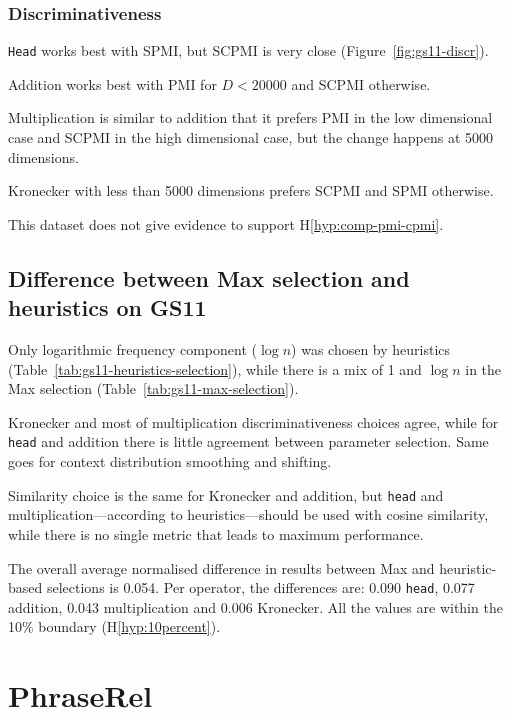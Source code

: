 \subsubsection{Discriminativeness}



\texttt{Head} works best with SPMI, but SCPMI is very close (Figure~\ref{fig:gs11-discr}).

Addition works best with PMI for $D < 20000$ and SCPMI otherwise.

Multiplication is similar to addition that it prefers PMI in the low dimensional case and SCPMI in the high dimensional case, but the change happens at 5000 dimensions.

Kronecker with less than 5000 dimensions prefers SCPMI and SPMI otherwise.

This dataset does not give evidence to support H\ref{hyp:comp-pmi-cpmi}.

\subsection{Difference between Max selection and heuristics on GS11}

Only logarithmic frequency component ($\log n$) was chosen by heuristics (Table~\ref{tab:gs11-heuristics-selection}), while there is a mix of 1 and $\log n$ in the Max selection (Table~\ref{tab:gs11-max-selection}).

Kronecker and most of multiplication discriminativeness choices agree, while for \texttt{head} and addition there is little agreement between parameter selection. Same goes for context distribution smoothing and shifting.

Similarity choice is the same for Kronecker and addition, but \texttt{head} and multiplication---according to heuristics---should be used with cosine similarity, while there is no single metric that leads to maximum performance.

The overall average normalised difference in results between Max and heuristic-based selections is 0.054. Per operator, the differences are: 0.090 \texttt{head}, 0.077 addition, 0.043 multiplication and 0.006 Kronecker. All the values are within the 10\% boundary (H\ref{hyp:10percent}).

\section{PhraseRel}
\label{sec:phraserel-experiment}

